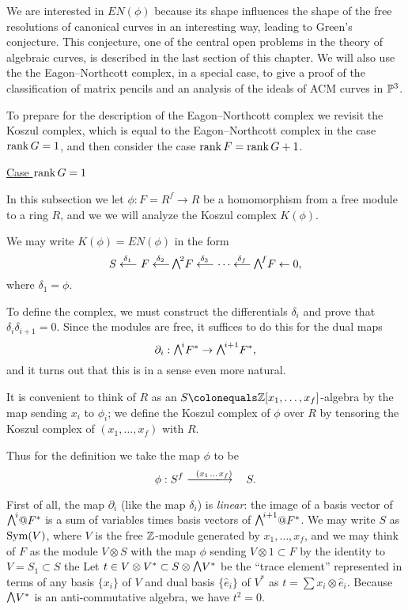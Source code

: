We
are interested in $EN(\phi)$ because its shape
influences the shape of the free resolutions of canonical curves in an
interesting way,
leading to Green's conjecture. This conjecture, one of the central open
problems in the theory of algebraic curves, is described in the last
section of this chapter. We will also use the the Eagon--Northcott
complex, in a special case, to give a proof of the classification of
matrix pencils and an analysis of the ideals of ACM curves in $\mathbb P^{3}$.

To prepare for the description of the Eagon--Northcott complex we revisit
the Koszul complex, which is equal
to the Eagon--Northcott complex in the case $\operatorname{rank} G = 1$, and then
consider the case $\operatorname{rank} F = \operatorname{rank} G + 1$.

\smallbreak
\noindent
\underline{Case $\operatorname{rank} G = 1$}
\smallbreak

In this subsection we let $\phi:F = R^{f}\to R$ be a homomorphism from
a free module to a ring $R$, and we
we will analyze the Koszul complex $K(\phi)$.

We may write
$K(\phi) = EN(\phi)$ in the form
$$
S \luto{\,\delta_{1}} \!F \luto{\,\delta_{2}}\!\! \mwedge^{2}F
\luto{\,\delta_{3}} \!\cdots \luto{\,\delta_{f}}\!\!\mwedge^{f}F\leftarrow 0, 
$$
where $\delta_{1} = \phi$.

To define the complex, we must construct the differentials $\delta_{i}$
and prove that
$\delta_{i}\delta_{i+1} = 0$. Since the modules are free, it suffices
to do this for the
dual maps
$$
\partial_{i}: \mwedge^{i}F^{*} \to \mwedge^{i+1}F^{*},
$$
and it turns out that this is in a sense even more natural.

It is convenient to think of $R$ as an $S \colonequals  \ZZ[x_{1},\dots,
x_{f}]$-algebra by the map sending
$x_{i}$ to $\phi_{i}$; we  define the Koszul complex of $\phi$ over $R$
%
by tensoring
the Koszul complex of $(x_{1}, \dots, x_{f})$ with $R$.

Thus for the definition we take the map $\phi$ to be
$$
\phi: S^{f}\ruuuto {\ \
(x_{1} \,\dots \, x_{f})
} \hskip0.7em S.
$$

First of all, the map $\partial_{i}$ (like the map $\delta_{i}$) is
\emph{linear}: the image of a basis vector of $\mwedge^{i}@F^{*} $ is a
sum of variables times basis vectors
of $\mwedge^{i+1}@F^{*}$. We may write $S$ as $\operatorname{Sym}(V)$, where $V$ is the
free ${\mathbb Z}$-module generated by $x_{1}, \dots, x_{f}$, and we may think
of $F$ as the module $V\otimes S$ with the map
$\phi$ sending $V\otimes 1\subset F$ by the identity to $V = S_{1}\subset S$
\emdash the 
%
Let $t\in V\otimes V^{*}\subset S\otimes \mwedge \,V^{*}$ be the ``trace
element'' represented in terms of any basis $\{x_{i}\}$ of $V$
and dual basis $\{\hat e_{i}\}$ of $V^{*}$ as $t = \sum x_{i}\otimes
\hat e_{i}$. Because $\mwedge \,V^{*}$ is
an anti-commutative algebra, we have $t^{2} = 0$.


